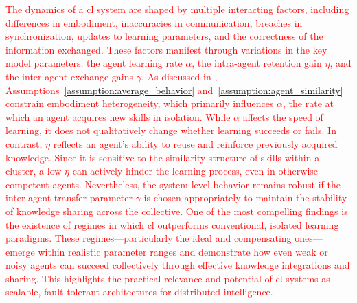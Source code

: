 \documentclass[12pt]{article}
\newcommand\myhl[1]{\textcolor{red}{#1}}
\begin{document}
\myhl{The dynamics of a \ac{cl} system are shaped by multiple interacting factors, including differences in embodiment, inaccuracies in communication, breaches in synchronization, updates to learning parameters, and the correctness of the information exchanged. These factors manifest through variations in the key model parameters: the agent learning rate $\alpha$, the intra-agent retention gain $\eta$, and the inter-agent exchange gains ${\gamma}$. As discussed in \nameref{sec:methods}, Assumptions~\ref{assumption:average_behavior} and~\ref{assumption:agent_similarity} constrain embodiment heterogeneity, which primarily influences $\alpha$, the rate at which an agent acquires new skills in isolation. While $\alpha$ affects the speed of learning, it does not qualitatively change whether learning succeeds or fails. In contrast, $\eta$ reflects an agent’s ability to reuse and reinforce previously acquired knowledge. Since it is sensitive to the similarity structure of skills within a cluster, a low $\eta$ can actively hinder the learning process, even in otherwise competent agents. Nevertheless, the system-level behavior remains robust if the inter-agent transfer parameter $\gamma$ is chosen appropriately to maintain the stability of knowledge sharing across the collective. One of the most compelling findings is the existence of regimes in which \ac{cl} outperforms conventional, isolated learning paradigms. These regimes---particularly the ideal and compensating ones---emerge within realistic parameter ranges and demonstrate how even weak or noisy agents can succeed collectively through effective knowledge integrations and sharing. This highlights the practical relevance and potential of \ac{cl} systems as scalable, fault-tolerant architectures for distributed intelligence.
}

\end{document}
